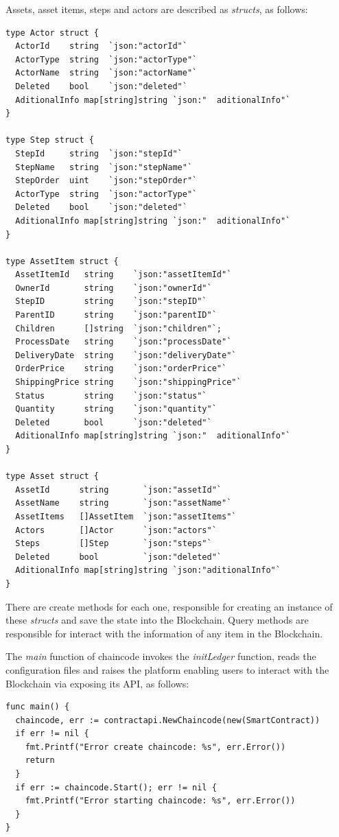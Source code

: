 Assets, asset items, steps and actors are described as \textit{structs}, as follows:

\begin{verbatim}
type Actor struct {
  ActorId    string  `json:"actorId"`
  ActorType  string  `json:"actorType"`
  ActorName  string  `json:"actorName"`
  Deleted    bool    `json:"deleted"`
  AditionalInfo map[string]string `json:"  aditionalInfo"`
}

type Step struct {
  StepId     string  `json:"stepId"`
  StepName   string  `json:"stepName"`
  StepOrder  uint    `json:"stepOrder"`
  ActorType  string  `json:"actorType"`
  Deleted    bool    `json:"deleted"`
  AditionalInfo map[string]string `json:"  aditionalInfo"`
}

type AssetItem struct {
  AssetItemId   string    `json:"assetItemId"`
  OwnerId       string    `json:"ownerId"`
  StepID        string    `json:"stepID"`
  ParentID      string    `json:"parentID"`
  Children      []string  `json:"children"`;
  ProcessDate   string    `json:"processDate"`
  DeliveryDate  string    `json:"deliveryDate"`
  OrderPrice    string    `json:"orderPrice"`
  ShippingPrice string    `json:"shippingPrice"`
  Status        string    `json:"status"`
  Quantity      string    `json:"quantity"`
  Deleted       bool      `json:"deleted"`
  AditionalInfo map[string]string `json:"  aditionalInfo"`
}

type Asset struct {
  AssetId      string       `json:"assetId"`
  AssetName    string       `json:"assetName"`
  AssetItems   []AssetItem  `json:"assetItems"`
  Actors       []Actor      `json:"actors"`
  Steps        []Step       `json:"steps"`
  Deleted      bool         `json:"deleted"`
  AditionalInfo map[string]string `json:"aditionalInfo"`
}
\end{verbatim}

There are create methods for each one,  responsible for creating an instance of these \textit{structs} and save the state into the Blockchain. Query methods are responsible for interact with the information of any item in the Blockchain.


The \textit{main} function of chaincode invokes the \textit{initLedger} function, reads the configuration files and raises the platform enabling users to interact with the Blockchain via exposing its API, as follows: 

\begin{verbatim}
func main() {
  chaincode, err := contractapi.NewChaincode(new(SmartContract))
  if err != nil {
    fmt.Printf("Error create chaincode: %s", err.Error())
    return
  }
  if err := chaincode.Start(); err != nil {
    fmt.Printf("Error starting chaincode: %s", err.Error())
  }
}
\end{verbatim}

